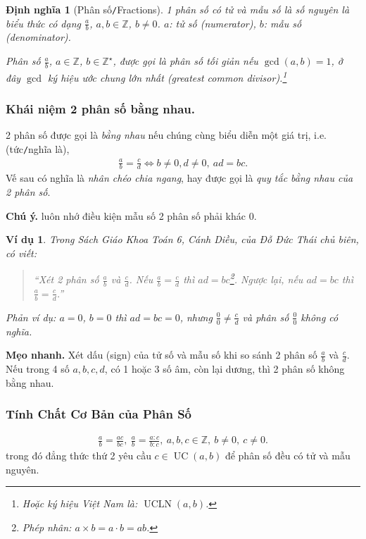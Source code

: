 \documentclass{article}
\numberwithin{equation}{section}
\newtheorem{definition}{Định nghĩa}[section]
\newtheorem{example}{Ví dụ}[section]
\begin{document}
\begin{definition}[Phân số\texttt{/}Fractions]
	1 \emph{phân số} có tử và mẫu số là số nguyên là biểu thức có dạng $\frac{a}{b}$, $a,b\in\mathbb{Z}$, $b\ne 0$. $a$: tử số (numerator), $b$: mẫu số (denominator).
	
	Phân số $\frac{a}{b}$, $a\in\mathbb{Z}$, $b\in\mathbb{Z}^\star$, được gọi là \emph{phân số tối giản} nếu $\operatorname{gcd}(a,b) = 1$, ở đây $\operatorname{gcd}$ ký hiệu \emph{ước chung lớn nhất} (greatest common divisor).\footnote{Hoặc ký hiệu Việt Nam là: $\operatorname{UCLN}(a,b)$.}
\end{definition}

\subsubsection{Khái niệm 2 phân số bằng nhau.} 2 phân số được gọi là \textit{bằng nhau} nếu chúng cùng biểu diễn một giá trị, i.e. (tức\texttt{/}nghĩa là),
\begin{align}
	\boxed{\frac{a}{b} = \frac{c}{d}\Leftrightarrow b\ne 0, d\ne 0,\ ad = bc.}
\end{align}
Vế sau có nghĩa là \textit{nhân chéo chia ngang}, hay được gọi là \textit{quy tắc bằng nhau của 2 phân số}.

\textbf{Chú ý.} luôn nhớ điều kiện mẫu số 2 phân số phải khác 0.

\begin{example}
	Trong Sách Giáo Khoa Toán 6, Cánh Diều, của Đỗ Đức Thái chủ biên, có viết:
	\begin{quotation}
		``Xét 2 phân số $\frac{a}{b}$ và $\frac{c}{d}$. Nếu $\frac{a}{b} = \frac{c}{d}$ thì $ad = bc$\footnote{Phép nhân: $a\times b = a\cdot b = ab$.}. Ngược lại, nếu $ad = bc$ thì $\frac{a}{b} = \frac{c}{d}$.''
	\end{quotation}
	Phản ví dụ: $a = 0$, $b = 0$ thì $ad = bc = 0$, nhưng $\frac{0}{0}\ne\frac{c}{d}$ và phân số $\frac{0}{0}$ không có nghĩa.
\end{example}
\textbf{Mẹo nhanh.} Xét dấu (sign) của tử số và mẫu số khi so sánh 2 phân số $\frac{a}{b}$ và $\frac{c}{d}$. Nếu trong 4 số $a,b,c,d$, có 1 hoặc 3 số âm, còn lại dương, thì 2 phân số không bằng nhau.

\subsubsection{Tính Chất Cơ Bản của Phân Số}
\begin{align}
	\boxed{\frac{a}{b} = \frac{ac}{bc},\ \frac{a}{b} = \frac{a:c}{b:c},\ a,b,c\in\mathbb{Z},\ b\ne 0,\ c\ne 0.}
\end{align}
trong đó đẳng thức thứ 2 yêu cầu $c\in\operatorname{UC}(a,b)$ để phân số đều có tử và mẫu nguyên.
\end{document}
